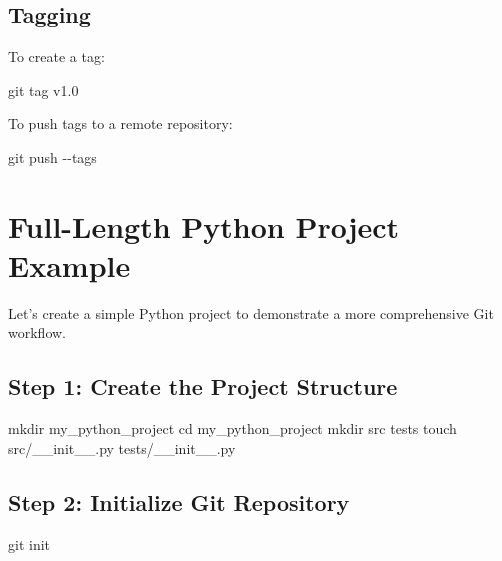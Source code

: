 \documentclass[
  letterpaper,
  DIV=11,
  numbers=noendperiod]{scrreprt}
\newenvironment{Shaded}{\begin{snugshade}}{\end{snugshade}}
\newcommand{\AttributeTok}[1]{\textcolor[rgb]{0.40,0.45,0.13}{#1}}
\newcommand{\BuiltInTok}[1]{\textcolor[rgb]{0.00,0.23,0.31}{#1}}
\newcommand{\FunctionTok}[1]{\textcolor[rgb]{0.28,0.35,0.67}{#1}}
\newcommand{\NormalTok}[1]{\textcolor[rgb]{0.00,0.23,0.31}{#1}}
\begin{document}
\subsection{Tagging}\label{tagging}

To create a tag:

\begin{Shaded}
\begin{Highlighting}[]
\FunctionTok{git}\NormalTok{ tag v1.0}
\end{Highlighting}
\end{Shaded}

To push tags to a remote repository:

\begin{Shaded}
\begin{Highlighting}[]
\FunctionTok{git}\NormalTok{ push }\AttributeTok{{-}{-}tags}
\end{Highlighting}
\end{Shaded}

\section{Full-Length Python Project
Example}\label{full-length-python-project-example}

Let's create a simple Python project to demonstrate a more comprehensive
Git workflow.

\subsection{Step 1: Create the Project
Structure}\label{step-1-create-the-project-structure}

\begin{Shaded}
\begin{Highlighting}[]
\FunctionTok{mkdir}\NormalTok{ my\_python\_project}
\BuiltInTok{cd}\NormalTok{ my\_python\_project}
\FunctionTok{mkdir}\NormalTok{ src tests}
\FunctionTok{touch}\NormalTok{ src/\_\_init\_\_.py tests/\_\_init\_\_.py}
\end{Highlighting}
\end{Shaded}

\subsection{Step 2: Initialize Git
Repository}\label{step-2-initialize-git-repository}

\begin{Shaded}
\begin{Highlighting}[]
\FunctionTok{git}\NormalTok{ init}
\end{Highlighting}
\end{Shaded}
\end{document}
